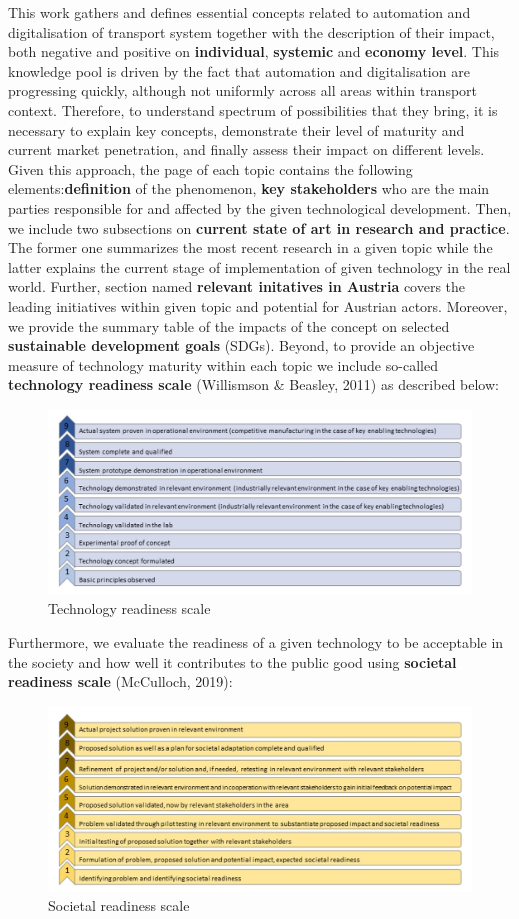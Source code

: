 \documentclass[
]{book}
\begin{document}
This work gathers and defines essential concepts related to automation and digitalisation of transport system together with the description of their impact, both negative and positive on \textbf{individual}, \textbf{systemic} and \textbf{economy level}. This knowledge pool is driven by the fact that automation and digitalisation are progressing quickly, although not uniformly across all areas within transport context. Therefore, to understand spectrum of possibilities that they bring, it is necessary to explain key concepts, demonstrate their level of maturity and current market penetration, and finally assess their impact on different levels. Given this approach, the page of each topic contains the following elements:\textbf{definition} of the phenomenon,
\textbf{key stakeholders} who are the main parties responsible for and affected by the given technological development. Then, we include two subsections on \textbf{current state of art in research and practice}. The former one summarizes the most recent research in a given topic while the latter explains the current stage of implementation of given technology in the real world. Further, section named \textbf{relevant initatives in Austria} covers the leading initiatives within given topic and potential for Austrian actors. Moreover, we provide the summary table of the impacts of the concept on selected \textbf{sustainable development goals} (SDGs). Beyond, to provide an objective measure of technology maturity within each topic we include so-called \textbf{technology readiness scale} (Willismson \& Beasley, 2011) as described below:

\begin{figure}
\includegraphics[width=0.6\linewidth]{image/TRL_cropped} \caption{Technology readiness scale}\label{fig:unnamed-chunk-2}
\end{figure}

Furthermore, we evaluate the readiness of a given technology to be acceptable in the society and how well it contributes to the public good using \textbf{societal readiness scale} (McCulloch, 2019):

\begin{figure}
\includegraphics[width=0.6\linewidth]{image/SRL_cropped} \caption{Societal readiness scale}\label{fig:unnamed-chunk-3}
\end{figure}
\end{document}
